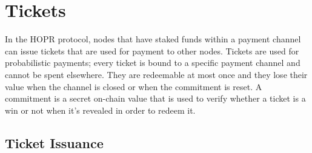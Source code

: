 \section{Tickets}
\label{sec:tickets}

In the HOPR protocol, nodes that have staked funds within a payment channel can issue tickets that are used for payment to other nodes.
Tickets are used for probabilistic payments; every ticket is bound to a specific payment channel and cannot be spent elsewhere.
They are redeemable at most once and they lose their value when the channel is closed or when the commitment is reset. A commitment is a secret on-chain value that is used to verify whether a ticket is a win or not when it's revealed in order to redeem it.

\subsection{Ticket Issuance}

